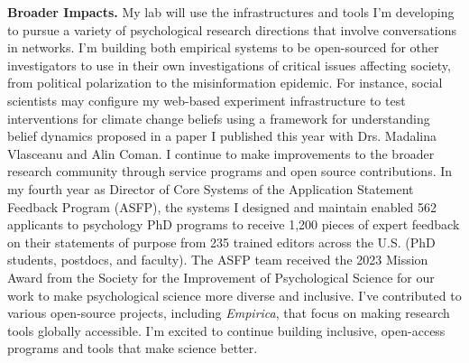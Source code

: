 \documentclass{article}
\begin{document}
\textbf{Broader Impacts.} My lab will use the infrastructures and tools I'm developing to pursue a variety of psychological research directions that involve conversations in networks. I'm building both empirical systems to be open-sourced for other investigators to use in their own investigations of critical issues affecting society, from political polarization to the misinformation epidemic. For instance, social scientists may configure my web-based experiment infrastructure to test interventions for climate change beliefs using a framework for understanding belief dynamics proposed in a paper I published this year with Drs. Madalina Vlasceanu and Alin Coman. I continue to make improvements to the broader research community through service programs and open source contributions. In my fourth year as Director of Core Systems of the Application Statement Feedback Program (ASFP), the systems I designed and maintain enabled 562 applicants to psychology PhD programs to receive 1,200 pieces of expert feedback on their statements of purpose from 235 trained editors across the U.S. (PhD students, postdocs, and faculty). The ASFP team received the 2023 Mission Award from the Society for the Improvement of Psychological Science for our work to make psychological science more diverse and inclusive. I've contributed to various open-source projects, including \textit{Empirica}, that focus on making research tools globally accessible. I'm excited to continue building inclusive, open-access programs and tools that make science better.
\end{document}
